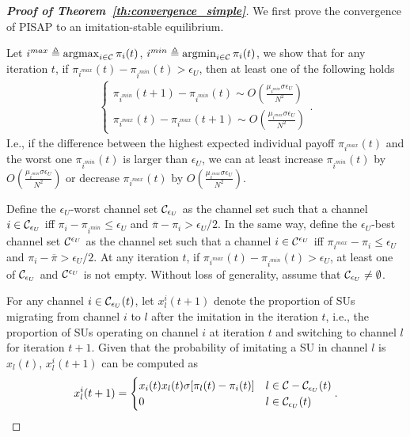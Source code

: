 \documentclass[12pt, onecolumn]{IEEEtran}
\theoremstyle{plain}
\theoremstyle{definition}
\newcommand{\argmax}{\operatornamewithlimits{argmax}}
\newcommand{\argmin}{\operatornamewithlimits{argmin}}
\begin{document}
\begin{proof}[\textbf{Proof of Theorem~\ref{th:convergence_simple}}]

We first prove the convergence of PISAP to an imitation-stable equilibrium.

Let $i^{max}\triangleq\argmax_{i\in{\cal C}} \pi_i(t)$, $i^{min}\triangleq\argmin_{i\in{\cal C}} \pi_i(t)$, we show that for any iteration $t$, if $\pi_{i^{max}}(t)-\pi_{i^{min}}(t)>\epsilon_U$, then at least one of the following holds
\begin{eqnarray*}
\begin{cases}
\pi_{i^{min}}(t+1)-\pi_{i^{min}}(t) \sim O(\frac{\mu_{i^{min}}\sigma\epsilon_U}{N^2}) \\
\pi_{i^{max}}(t)-\pi_{i^{max}}(t+1) \sim O(\frac{\mu_{i^{max}}\sigma\epsilon_U}{N^2})
\end{cases}.
\end{eqnarray*}
I.e., if the difference between the highest expected individual payoff $\pi_{i^{max}}(t)$ and the worst one $\pi_{i^{min}}(t)$ is larger than $\epsilon_U$, we can at least increase $\pi_{i^{min}}(t)$ by $O(\frac{\mu_{i^{min}}\sigma\epsilon_U}{N^2})$ or decrease $\pi_{i^{max}}(t)$ by $O(\frac{\mu_{i^{max}}\sigma\epsilon_U}{N^2})$.



Define the $\epsilon_U$-worst channel set ${\cal C}_{\epsilon_U}$ as the channel set such that a channel $i\in{\cal C}_{\epsilon_U}$ iff $\pi_i-\pi_{i^{min}}\le \epsilon_U$ and $\overline{\pi}-\pi_i> \epsilon_U/2$. In the same way, define the $\epsilon_U$-best channel set ${\cal C}^{\epsilon_U}$ as the channel set such that a channel $i\in{\cal C}^{\epsilon_U}$ iff $\pi_{i^{max}}-\pi_i \le \epsilon_U$ and $\pi_i-\overline{\pi}> \epsilon_U/2$. At any iteration $t$, if $\pi_{i^{max}}(t)-\pi_{i^{min}}(t)>\epsilon_U$, at least one of ${\cal C}_{\epsilon_U}$ and ${\cal C}^{\epsilon_U}$ is not empty. Without loss of generality, assume that ${\cal C}_{\epsilon_U}\ne \emptyset$.


For any channel $i\in{\cal C}_{\epsilon_U}(t)$, let $x^i_l(t+1)$ denote the proportion of SUs migrating from channel $i$ to $l$ after the imitation in the iteration $t$, i.e., the proportion of SUs operating on channel $i$ at iteration $t$ and switching to channel $l$ for iteration $t+1$. Given that the probability of imitating a SU in channel $l$ is $x_l(t)$, $x^i_l(t+1)$ can be computed as
\begin{equation*}
x^i_l(t+1)=
\begin{cases}
x_i(t)x_l(t)\sigma[\pi_l(t)-\pi_i(t)] & l\in{\cal C}-{\cal C}_{\epsilon_U}(t) \\
0 & l\in{\cal C}_{\epsilon_U}(t)
\end{cases}.
\end{equation*}


\end{proof}
\end{document}
